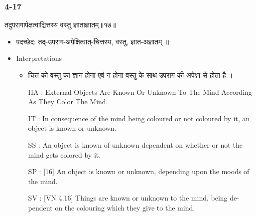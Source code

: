 \begin{frame}[fragile]\frametitle{4-17}
\begin{sanskrit}
तदुपरागापेक्षत्वाच्चित्तस्य वस्तु ज्ञाताज्ञातम्॥१७॥
\end{sanskrit}

	\begin{itemize}
	\item पदच्छेद:  तद्-उपराग-अपेक्षित्वात्-चित्तस्य, वस्तु, ज्ञात-अज्ञातम् ॥
	\item Interpretations
		\begin{itemize}	
		\item चित्त को वस्तु का ज्ञान होना एवं न होना वस्तु के साथ उपराग की अपेक्षा से होता है ।
		\item [HA]: External Objects Are Known Or Unknown To The Mind According As They Color The Mind.
		\item [IT]: In consequence of the mind being coloured or not coloured by it, an object is known or unknown.
		\item [SS]: An object is known of unknown dependent on whether or not the mind gets colored by it.
		\item [SP]: [16] An object is known or unknown, depending upon the moods of the mind.
		\item [SV]: [VN 4.16] Things are known or unknown to the mind, being de-pendent on the colouring which they give to the mind. 
		\end{itemize}
	\end{itemize}
\end{frame}


